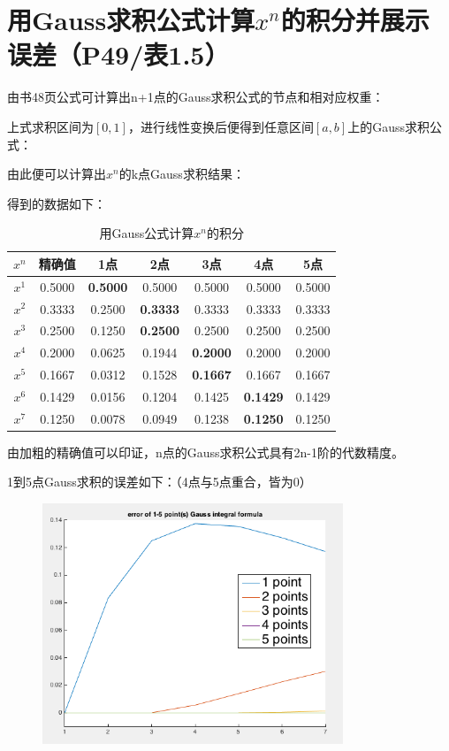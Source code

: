 \documentclass{homework}
\begin{document}
\section{用Gauss求积公式计算$x^n$的积分并展示误差（P49/表1.5）}
由书48页公式可计算出n+1点的Gauss求积公式的节点和相对应权重：

上式求积区间为$[0,1]$，进行线性变换后便得到任意区间$[a,b]$上的Gauss求积公式：

由此便可以计算出$x^n$的k点Gauss求积结果：

得到的数据如下：
\begin{table}[H]
\centering
\caption{用Gauss公式计算$x^n$的积分}
\begin{tabular}{|c|c|c|c|c|c|c|}
\hline
$x^n$ & 精确值 & 1点 & 2点 & 3点 & 4点 & 5点 \\\hline
$x^1$ & 0.5000 & {\bf 0.5000} & 0.5000 & 0.5000 & 0.5000 & 0.5000 \\\hline
$x^2$ & 0.3333 & 0.2500 & {\bf 0.3333} & 0.3333 & 0.3333 & 0.3333 \\\hline
$x^3$ & 0.2500 & 0.1250 & {\bf 0.2500} & 0.2500 & 0.2500 & 0.2500 \\\hline
$x^4$ & 0.2000 & 0.0625 & 0.1944 & {\bf 0.2000} & 0.2000 & 0.2000 \\\hline
$x^5$ & 0.1667 & 0.0312 & 0.1528 & {\bf 0.1667} & 0.1667 & 0.1667 \\\hline
$x^6$ & 0.1429 & 0.0156 & 0.1204 & 0.1425 & {\bf 0.1429} & 0.1429 \\\hline
$x^7$ & 0.1250 & 0.0078 & 0.0949 & 0.1238 & {\bf 0.1250} & 0.1250 \\\hline
\end{tabular}
\end{table}
由加粗的精确值可以印证，n点的Gauss求积公式具有2n-1阶的代数精度。

1到5点Gauss求积的误差如下：（4点与5点重合，皆为0）
\begin{figure}[H]
\includegraphics[width=9cm]{gausserr.png}
\centering
\end{figure}
\end{document}
